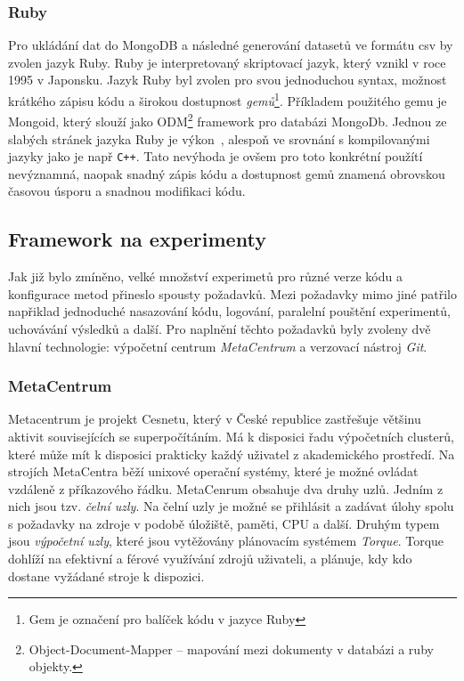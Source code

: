 \documentclass[thesis=M,czech]{FITthesis}[2012/06/26]
\begin{document}
\subsubsection*{Ruby}
Pro ukládání dat do MongoDB a následné generování datasetů ve formátu csv by zvolen jazyk Ruby. Ruby je interpretovaný skriptovací jazyk, který vznikl v roce 1995 v Japonsku.
Jazyk Ruby byl zvolen pro svou jednoduchou syntax, možnost krátkého zápisu kódu a širokou dostupnost \textit{gemů}\footnote{Gem je označení pro balíček kódu v jazyce Ruby}. Příkladem použitého gemu je Mongoid, který slouží jako ODM\footnote{Object-Document-Mapper -- mapování mezi dokumenty v databázi a ruby objekty.} framework pro databázi MongoDb.
Jednou ze slabých stránek jazyka Ruby je výkon~\cite{ruby_performance}, alespoň ve srovnání s kompilovanými jazyky jako je např \texttt{C++}. Tato nevýhoda je ovšem pro toto konkrétní použítí nevýznamná, naopak snadný zápis kódu a dostupnost gemů znamená obrovskou časovou úsporu a snadnou modifikaci kódu.


\subsection{Framework na experimenty}
Jak již bylo zmíněno, velké množství experimetů pro různé verze kódu a konfigurace metod přineslo spousty požadavků. Mezi požadavky mimo jiné patřilo napřiklad jednoduché nasazování kódu, logování, paralelní pouštění experimentů, uchovávání výsledků a další. Pro naplnění těchto požadavků byly zvoleny dvě hlavní technologie: výpočetní centrum \textit{MetaCentrum} a verzovací nástroj \textit{Git}.


\subsubsection*{MetaCentrum}
Metacentrum je projekt Cesnetu, který v České republice zastřešuje většinu aktivit souvisejících se superpočítáním. Má k disposici řadu výpočetních clusterů, které může mít k disposici prakticky každý uživatel z akademického prostředí.
Na strojích MetaCentra běží unixové operační systémy, které je možné ovládat vzdáleně z příkazového řádku. MetaCenrum obsahuje dva druhy uzlů. Jedním z nich jsou tzv. \textit{čelní uzly}.
Na čelní uzly je možné se přihlásit a zadávat úlohy spolu s požadavky na zdroje v podobě úložiště, paměti, CPU a další.
Druhým typem jsou \textit{výpočetní uzly}, které jsou vytěžovány plánovacím systémem \textit{Torque}. Torque dohlíží na efektivní a férové využívání zdrojů uživateli, a plánuje, kdy kdo dostane vyžádané stroje k dispozici.~\cite{metacentrum}
\end{document}

